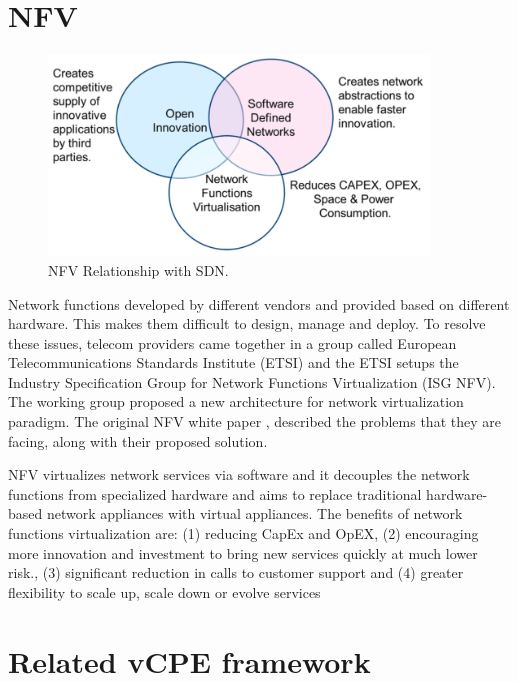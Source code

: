 \section{NFV} \label{sec:nfv}

\begin{figure}[!ht]
\centering
\includegraphics[width=0.9\textwidth]{./fig/nfv_and_sdn.png}
\caption{NFV Relationship with SDN. \cite{nfv-wp}}
\label{fig:nfv_and_sdn}
\end{figure}

Network functions developed by different vendors and provided based on different hardware. This makes them difficult to design, manage and deploy.
To resolve these issues, telecom providers came together in a group called European Telecommunications Standards Institute (ETSI) and the ETSI setups the Industry Specification Group for Network Functions Virtualization (ISG NFV). The working group proposed a new architecture for network virtualization paradigm. The original NFV white paper \cite{nfv-wp}, described the problems that they are facing, along with their proposed solution.

NFV virtualizes network services via software and it decouples the network functions from specialized hardware and aims to replace traditional hardware-based network appliances with virtual appliances.
The benefits of network functions virtualization are: (1) reducing CapEx and OpEX, (2) encouraging more innovation and investment to bring new services quickly at much lower risk., (3) significant reduction in calls to customer support and (4) greater flexibility to scale up, scale down or evolve services





\section{Related vCPE framework} \label{sec:related_vcpe}

